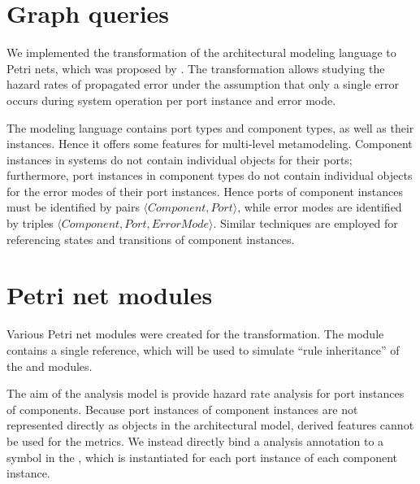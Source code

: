 \section{Graph queries}

We implemented the transformation of the architectural modeling language to Petri nets, which was proposed by \citet[Chapter~6]{Ecsedi16architecture}. The transformation allows studying the hazard rates of propagated error under the assumption that only a single error occurs during system operation per port instance and error mode.

The modeling language contains port types and component types, as well as their instances. Hence it offers some features for multi-level metamodeling. Component instances in systems do not contain individual objects for their ports; furthermore, port instances in component types do not contain individual objects for the error modes of their port instances. Hence ports of component instances must be identified by pairs \(\langle \textit{Component}, \textit{Port} \rangle\), while error modes are identified by triples \(\langle \textit{Component}, \textit{Port}, \textit{ErrorMode} \rangle\). Similar techniques are employed for referencing states and transitions of component instances.



\section{Petri net modules}

Various Petri net modules were created for the transformation. The module  contains a single reference, which will be used to simulate \enquote{rule inheritance} of the  and  modules.

The aim of the analysis model is provide hazard rate analysis for port instances of components. Because port instances of component instances are not represented directly as objects in the architectural model, derived features cannot be used for the metrics. We instead directly bind a  analysis annotation to a symbol in the , which is instantiated for each port instance of each component instance.



